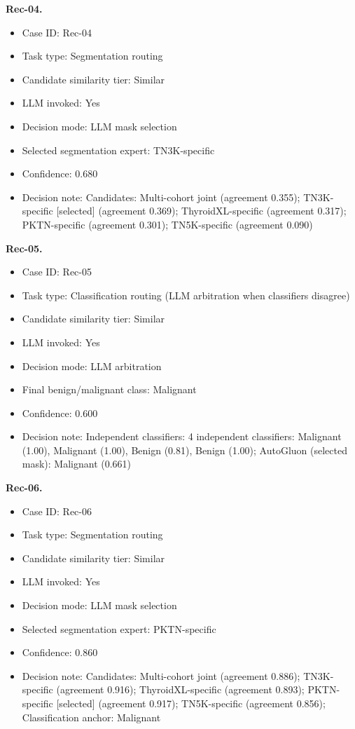 \noindent\textbf{Rec-04.}\par
\begin{itemize}[leftmargin=1.5em,topsep=0.1em,itemsep=0.05em]
\item Case ID: Rec-04
\item Task type: Segmentation routing
\item Candidate similarity tier: Similar
\item LLM invoked: Yes
\item Decision mode: LLM mask selection
\item Selected segmentation expert: TN3K-specific
\item Confidence: 0.680
\item Decision note: Candidates: Multi-cohort joint (agreement 0.355); TN3K-specific [selected] (agreement 0.369); ThyroidXL-specific (agreement 0.317); PKTN-specific (agreement 0.301); TN5K-specific (agreement 0.090)
\end{itemize}
\noindent\textbf{Rec-05.}\par
\begin{itemize}[leftmargin=1.5em,topsep=0.1em,itemsep=0.05em]
\item Case ID: Rec-05
\item Task type: Classification routing (LLM arbitration when classifiers disagree)
\item Candidate similarity tier: Similar
\item LLM invoked: Yes
\item Decision mode: LLM arbitration
\item Final benign/malignant class: Malignant
\item Confidence: 0.600
\item Decision note: Independent classifiers: 4 independent classifiers: Malignant (1.00), Malignant (1.00), Benign (0.81), Benign (1.00); AutoGluon (selected mask): Malignant (0.661)
\end{itemize}
\noindent\textbf{Rec-06.}\par
\begin{itemize}[leftmargin=1.5em,topsep=0.1em,itemsep=0.05em]
\item Case ID: Rec-06
\item Task type: Segmentation routing
\item Candidate similarity tier: Similar
\item LLM invoked: Yes
\item Decision mode: LLM mask selection
\item Selected segmentation expert: PKTN-specific
\item Confidence: 0.860
\item Decision note: Candidates: Multi-cohort joint (agreement 0.886); TN3K-specific (agreement 0.916); ThyroidXL-specific (agreement 0.893); PKTN-specific [selected] (agreement 0.917); TN5K-specific (agreement 0.856); Classification anchor: Malignant
\end{itemize}
